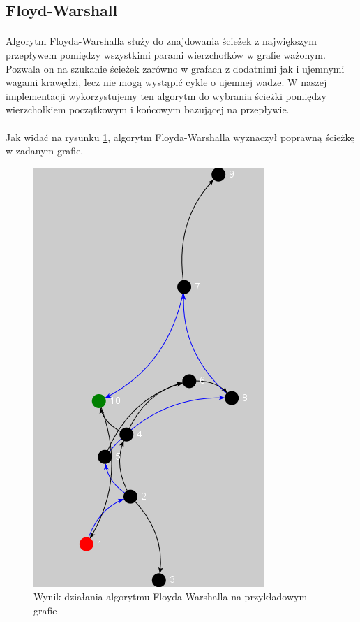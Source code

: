 \subsection{Floyd-Warshall}
\paragraph{}
Algorytm Floyda-Warshalla służy do znajdowania ścieżek z największym przepływem pomiędzy wszystkimi parami wierzchołków w grafie ważonym.
Pozwala on na szukanie ścieżek zarówno w grafach z dodatnimi jak i ujemnymi wagami krawędzi, lecz nie mogą wystąpić cykle o ujemnej wadze.
W naszej implementacji wykorzystujemy ten algorytm do wybrania ścieżki pomiędzy wierzchołkiem początkowym i końcowym bazującej na przepływie.

\paragraph{}
Jak widać na rysunku \ref{fig:floyd}, algorytm Floyda-Warshalla wyznaczył poprawną ścieżkę w zadanym grafie.
\begin{figure}[!h]
 \centering
 \includegraphics{algorithms/floyd}
 \caption{Wynik działania algorytmu Floyda-Warshalla na przykładowym grafie}
 \label{fig:floyd}
\end{figure}

